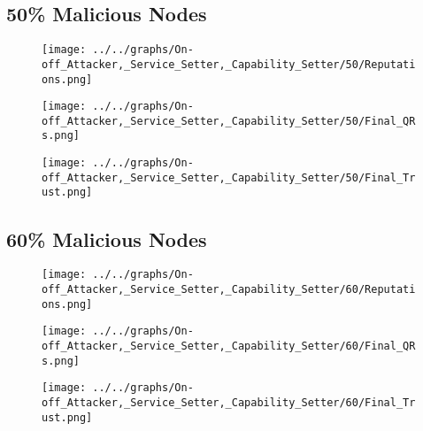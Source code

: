 \begin{minipage}[t]{0.49\columnwidth}
\subsection*{50\% Malicious Nodes}
    \begin{figure}[H]
        \centering
        \texttt{[image: ../../graphs/On-off\_Attacker,\_Service\_Setter,\_Capability\_Setter/50/Reputations.png]}
    \end{figure}
    \begin{figure}[H]
        \centering
        \texttt{[image: ../../graphs/On-off\_Attacker,\_Service\_Setter,\_Capability\_Setter/50/Final\_QRs.png]}
    \end{figure}
\end{minipage}
\begin{minipage}[t]{0.49\columnwidth}
    \begin{figure}[H]
        \centering
        \texttt{[image: ../../graphs/On-off\_Attacker,\_Service\_Setter,\_Capability\_Setter/50/Final\_Trust.png]}
    \end{figure}
\end{minipage}

\begin{minipage}[t]{0.49\columnwidth}
\subsection*{60\% Malicious Nodes}
    \begin{figure}[H]
        \centering
        \texttt{[image: ../../graphs/On-off\_Attacker,\_Service\_Setter,\_Capability\_Setter/60/Reputations.png]}
    \end{figure}
    \begin{figure}[H]
        \centering
        \texttt{[image: ../../graphs/On-off\_Attacker,\_Service\_Setter,\_Capability\_Setter/60/Final\_QRs.png]}
    \end{figure}
\end{minipage}
\begin{minipage}[t]{0.49\columnwidth}
    \begin{figure}[H]
        \centering
        \texttt{[image: ../../graphs/On-off\_Attacker,\_Service\_Setter,\_Capability\_Setter/60/Final\_Trust.png]}
    \end{figure}
\end{minipage}

